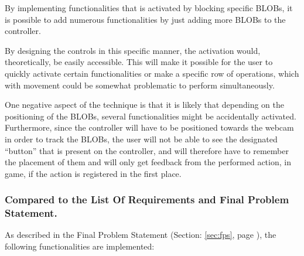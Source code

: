 By implementing functionalities that is activated by blocking specific BLOBs, it is possible to add numerous functionalities by just adding more BLOBs to the controller. 

By designing the controls in this specific manner, the activation would, theoretically, be easily accessible. This will make it possible for the user to quickly activate certain functionalities or make a specific row of operations, which with movement could be somewhat problematic to perform simultaneously. 

One negative aspect of the technique is that it is likely that depending on the positioning of the BLOBs, several functionalities might be accidentally activated. Furthermore, since the controller will have to be positioned towards the webcam in order to track the BLOBs, the user will not be able to see the designated “button” that is present on the controller, and will therefore have to remember the placement of them and will only get feedback from the performed action, in game, if the action is registered in the first place.


\subsubsection*{Compared to the List Of Requirements and Final Problem Statement.}
As described in the Final Problem Statement (Section: \ref{sec:fps}, page \pageref{sec:fps}), the following functionalities are implemented:

